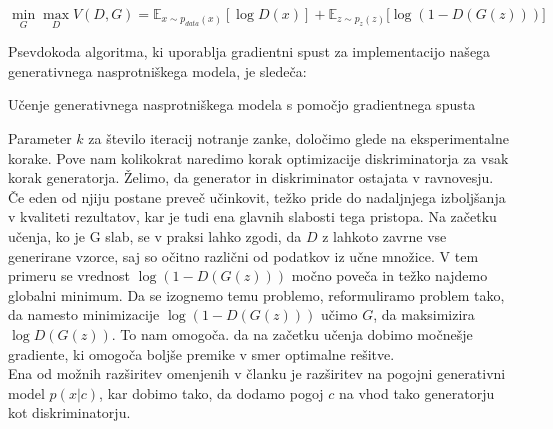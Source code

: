\documentclass[12pt,a4paper,twoside]{article}
\theoremstyle{definition} %
\theoremstyle{plain} %
\numberwithin{equation}{section}  %
\begin{document}
$$ \min_G\max_DV(D,G) = \mathbb{E}_{x \sim p_{data}(x)}[\log{D(x)}] + \mathbb{E}_{z \sim p_z(z)}[\log{(1-D(G(z)))]}$$ 

Psevdokoda algoritma, ki uporablja gradientni spust za implementacijo našega generativnega nasprotniškega modela, je sledeča: 
\begin{algorithm}
\caption{Učenje generativnega nasprotniškega modela s pomočjo gradientnega spusta}\label{euclid}
\begin{algorithmic}[1]
\EndFor
\EndFor
\end{algorithmic}
\end{algorithm}

Parameter $k$ za število iteracij notranje zanke, določimo glede na eksperimentalne korake. Pove nam kolikokrat naredimo korak optimizacije diskriminatorja za vsak korak generatorja. 
Želimo, da generator in diskriminator ostajata v ravnovesju. Če eden od njiju postane preveč učinkovit, težko pride do nadaljnjega izboljšanja v kvaliteti rezultatov, kar je tudi ena glavnih slabosti tega pristopa.  
Na začetku učenja, ko je G slab, se v praksi lahko zgodi, da $D$ z lahkoto zavrne vse generirane vzorce, saj so očitno različni od podatkov iz učne množice. V tem primeru se vrednost $\log(1-D(G(z)))$ močno poveča in težko najdemo globalni minimum. Da se izognemo temu problemo, reformuliramo problem tako, da namesto minimizacije  $\log(1-D(G(z)))$ učimo $G$, da maksimizira $\log{D(G(z))}$. To nam omogoča. da na začetku učenja dobimo močnešje gradiente, ki omogoča boljše premike v smer optimalne rešitve. 
\\
Ena od možnih razširitev omenjenih v članku je razširitev na pogojni generativni model $p(x | c)$, kar  dobimo tako, da dodamo pogoj $c$ na vhod tako generatorju kot diskriminatorju.  
\end{document}
